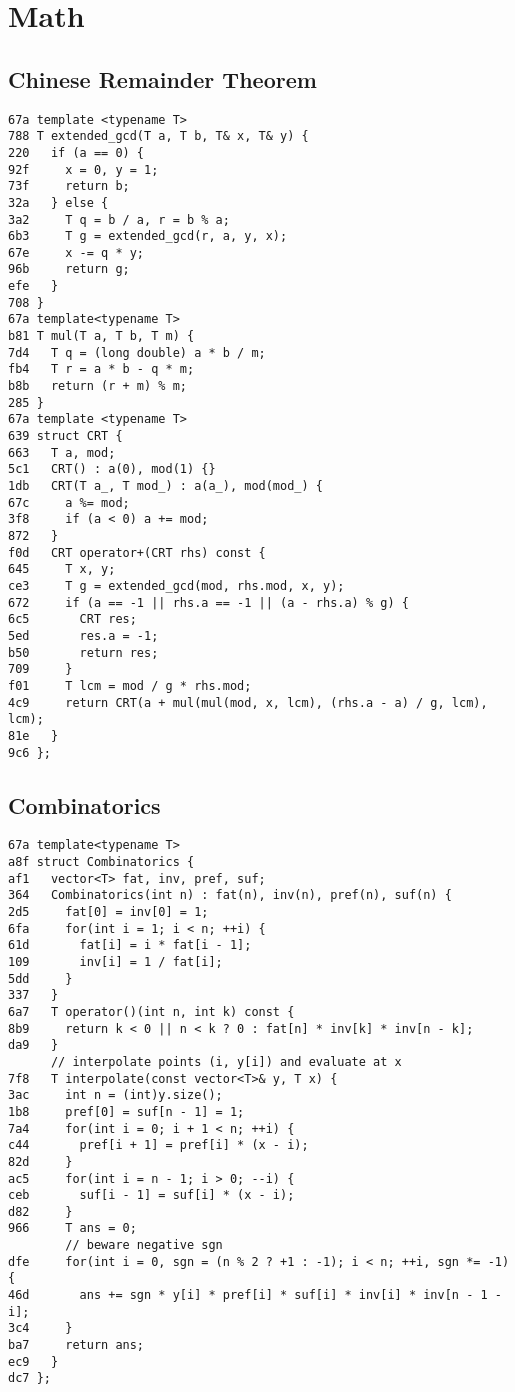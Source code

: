 \documentclass[10pt, a4paper, twoside]{article}
\begin{document}
%
%

\section{Math}

\subsection{Chinese Remainder Theorem}
\begin{lstlisting}
67a template <typename T>
788 T extended_gcd(T a, T b, T& x, T& y) {
220   if (a == 0) {
92f     x = 0, y = 1;
73f     return b;
32a   } else {
3a2     T q = b / a, r = b % a;
6b3     T g = extended_gcd(r, a, y, x);
67e     x -= q * y;
96b     return g;
efe   }
708 }
67a template<typename T>
b81 T mul(T a, T b, T m) {
7d4   T q = (long double) a * b / m;
fb4   T r = a * b - q * m;
b8b   return (r + m) % m;
285 }
67a template <typename T>
639 struct CRT {
663   T a, mod;
5c1   CRT() : a(0), mod(1) {}
1db   CRT(T a_, T mod_) : a(a_), mod(mod_) {
67c     a %= mod;
3f8     if (a < 0) a += mod;
872   } 
f0d   CRT operator+(CRT rhs) const {
645     T x, y;
ce3     T g = extended_gcd(mod, rhs.mod, x, y);
672     if (a == -1 || rhs.a == -1 || (a - rhs.a) % g) {
6c5       CRT res;
5ed       res.a = -1;
b50       return res;
709     }
f01     T lcm = mod / g * rhs.mod;
4c9     return CRT(a + mul(mul(mod, x, lcm), (rhs.a - a) / g, lcm), lcm);
81e   }
9c6 };
\end{lstlisting}

\subsection{Combinatorics}
\begin{lstlisting}
67a template<typename T>
a8f struct Combinatorics {
af1   vector<T> fat, inv, pref, suf;
364   Combinatorics(int n) : fat(n), inv(n), pref(n), suf(n) {
2d5     fat[0] = inv[0] = 1;
6fa     for(int i = 1; i < n; ++i) {
61d       fat[i] = i * fat[i - 1];
109       inv[i] = 1 / fat[i];
5dd     }
337   }
6a7   T operator()(int n, int k) const {
8b9     return k < 0 || n < k ? 0 : fat[n] * inv[k] * inv[n - k];
da9   }
      // interpolate points (i, y[i]) and evaluate at x
7f8   T interpolate(const vector<T>& y, T x) {
3ac     int n = (int)y.size();
1b8     pref[0] = suf[n - 1] = 1;
7a4     for(int i = 0; i + 1 < n; ++i) {
c44       pref[i + 1] = pref[i] * (x - i);
82d     }
ac5     for(int i = n - 1; i > 0; --i) {
ceb       suf[i - 1] = suf[i] * (x - i);
d82     }
966     T ans = 0;
        // beware negative sgn
dfe     for(int i = 0, sgn = (n % 2 ? +1 : -1); i < n; ++i, sgn *= -1) {
46d       ans += sgn * y[i] * pref[i] * suf[i] * inv[i] * inv[n - 1 - i];
3c4     }
ba7     return ans;
ec9   }
dc7 };
\end{lstlisting}
\end{document}
